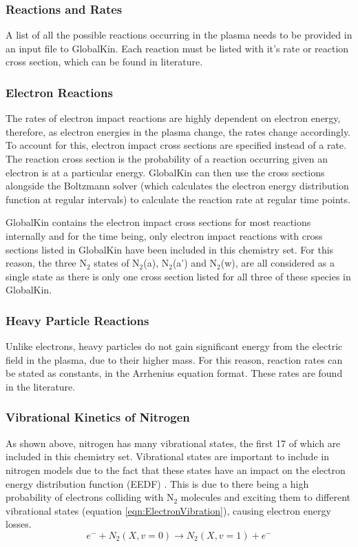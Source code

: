\documentclass[11pt, oneside]{article}   	%
\begin{document}
\subsubsection{Reactions and Rates}

A list of all the possible reactions occurring in the plasma needs to be provided in an input file to GlobalKin.
Each reaction must be listed with it's rate or reaction cross section, which can be found in literature.

\subsubsection*{Electron Reactions}
The rates of electron impact reactions are highly dependent on electron energy, therefore, as electron energies in the plasma change, the rates change accordingly.
To account for this, electron impact cross sections are specified instead of a rate.
The reaction cross section is the probability of a reaction occurring given an electron is at a particular energy.
GlobalKin can then use the cross sections alongside the Boltzmann solver (which calculates the electron energy distribution function at regular intervals) to calculate the reaction rate at regular time points.

GlobalKin contains the electron impact cross sections for most reactions internally and for the time being, only electron impact reactions with cross sections listed in GlobalKin have been included in this chemistry set.
For this reason, the three N$_2$ states of N$_2$(a), N$_2$(a') and N$_2$(w), are all considered as a single state as there is only one cross section listed for all three of these species in GlobalKin.

\subsubsection*{Heavy Particle Reactions}
Unlike electrons, heavy particles do not gain significant energy from the electric field in the plasma, due to their higher mass.
For this reason, reaction rates can be stated as constants, in the Arrhenius equation format.
These rates are found in the literature.


\subsubsection*{Vibrational Kinetics of Nitrogen}

As shown above, nitrogen has many vibrational states, the first 17 of which are included in this chemistry set.
Vibrational states are important to include in nitrogen models due to the fact that these states have an impact on the electron energy distribution function (EEDF) \cite{Guerra2004kinetic}.
This is due to there being a high probability of electrons colliding with N$_2$ molecules and exciting them to different vibrational states (equation \ref{eqn:ElectronVibration}), causing electron energy losses.
\begin{equation}
e^- + N_2(X,v=0) \rightarrow N_2(X,v=1) + e^-
\label{eqn:ElectronVibration}
\end{equation}
\end{document}
